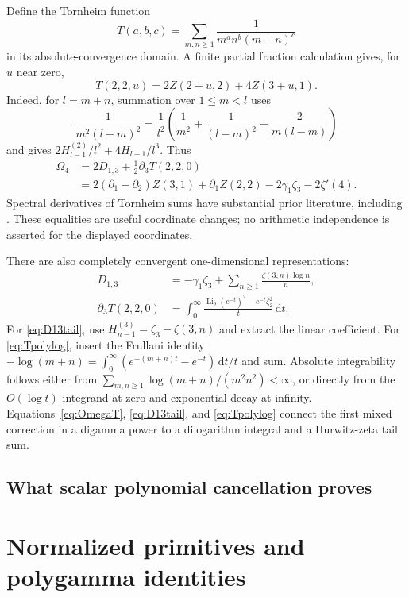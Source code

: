 \documentclass[11pt,a4paper]{article}
\numberwithin{equation}{section}
\theoremstyle{definition}
\theoremstyle{remark}
\DeclareMathOperator{\Li}{Li}
\newcommand{\dd}{\mathrm d}
\begin{document}
Define the Tornheim function
\[
 T(a,b,c)=\sum_{m,n\ge1}\frac1{m^an^b(m+n)^c}
\]
in its absolute-convergence domain.  A finite partial fraction
calculation gives, for $u$ near zero,
\begin{equation}
 T(2,2,u)=2Z(2+u,2)+4Z(3+u,1).
 \label{eq:T22}
\end{equation}
Indeed, for $l=m+n$, summation over $1\le m<l$ uses
\[
 \frac1{m^2(l-m)^2}
 =\frac1{l^2}\left(\frac1{m^2}+\frac1{(l-m)^2}
                    +\frac2{m(l-m)}\right)
\]
and gives $2H_{l-1}^{(2)}/l^2+4H_{l-1}/l^3$.
Thus
\begin{align}
 \Omega_4
 &=2D_{1,3}+\tfrac12\partial_3T(2,2,0)
 \label{eq:OmegaT}\\
 &=2(\partial_1-\partial_2)Z(3,1)+\partial_1Z(2,2)
                      -2\gamma_1\zeta_3-2\zeta'(4).
 \label{eq:OmegaInner}
\end{align}
Spectral derivatives of Tornheim sums have substantial prior literature,
including \cite{BB2014}.  These equalities are useful coordinate changes;
no arithmetic independence is asserted for the displayed coordinates.

There are also completely convergent one-dimensional representations:
\begin{align}
 D_{1,3}
  &=-\gamma_1\zeta_3+
        \sum_{n\ge1}\frac{\zeta(3,n)\log n}{n},
 \label{eq:D13tail}\\
 \partial_3T(2,2,0)
  &=\int_0^\infty
        \frac{\Li_2(e^{-t})^2-e^{-t}\zeta_2^2}{t}\,\dd t.
 \label{eq:Tpolylog}
\end{align}
For \eqref{eq:D13tail}, use
$H_{n-1}^{(3)}=\zeta_3-\zeta(3,n)$ and extract the linear
coefficient.  For \eqref{eq:Tpolylog}, insert the Frullani identity
$-\log(m+n)=\int_0^\infty(e^{-(m+n)t}-e^{-t})\,\dd t/t$
and sum.  Absolute integrability follows either from
$\sum_{m,n\ge1}\log(m+n)/(m^2n^2)<\infty$, or directly from
the $O(\log t)$ integrand at zero and exponential decay at infinity.
Equations~\eqref{eq:OmegaT}, \eqref{eq:D13tail}, and
\eqref{eq:Tpolylog} connect the first mixed correction in a digamma
power to a dilogarithm integral and a Hurwitz-zeta tail sum.

\subsection{What scalar polynomial cancellation proves}
\label{subsec:canonical}


\section{Normalized primitives and polygamma identities}
\label{sec:primitives}
\end{document}
